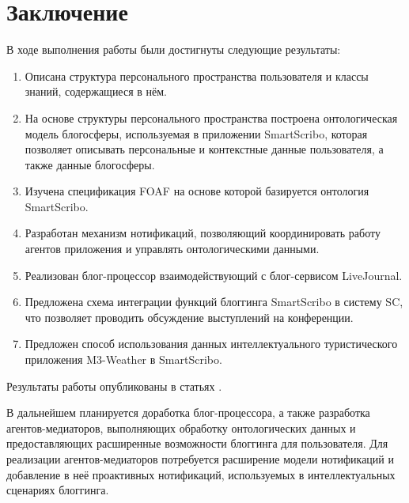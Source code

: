 \newpage

\chapter*{Заключение}
\vspace{-1cm}
В ходе выполнения работы были достигнуты следующие результаты:

\begin{enumerate}
\item
Описана структура персонального пространства пользователя и классы знаний, содержащиеся в нём.

\item
На основе структуры персонального пространства построена онтологическая модель блогосферы, используемая в приложении SmartScribo, которая позволяет описывать персональные и контекстные данные пользователя, а также данные блогосферы.

\item
Изучена спецификация FOAF на основе которой базируется онтология SmartScribo.

\item
Разработан механизм нотификаций, позволяющий координировать работу агентов приложения и управлять онтологическими данными.

\item
Реализован блог-процессор взаимодействующий с блог-сервисом LiveJournal.

\item
Предложена схема интеграции функций блоггинга SmartScribo в систему SC, что позволяет проводить обсуждение выступлений на конференции.

\item
Предложен способ использования данных интеллектуального туристического приложения M3-Weather в SmartScribo.

\end{enumerate}
Результаты работы опубликованы в статьях \cite{scblogging, smartscribo, smartscribo-old}.

В дальнейшем планируется доработка блог-процессора, а также разработка агентов-медиаторов, выполняющих обработку онтологических данных и предоставляющих расширенные возможности блоггинга для пользователя. Для реализации агентов-медиаторов потребуется расширение модели нотификаций и добавление в неё проактивных нотификаций, используемых в интеллектуальных сценариях блоггинга. 
